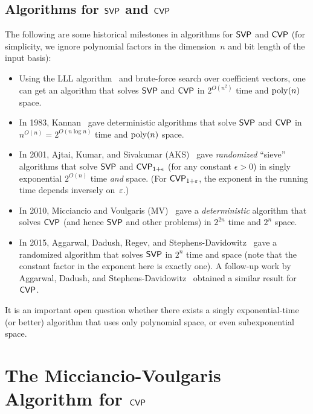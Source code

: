 \documentclass[11pt]{article}
\begin{document}
\subsection{Algorithms for $\mathsf{SVP}$ and $\mathsf{CVP}$}%
\label{sec:algorithms-svp-cvp}

The following are some historical milestones in algorithms for $\mathsf{SVP}$ and $\mathsf{CVP}$ (for simplicity, we ignore polynomial factors in the dimension~$n$ and bit length of the input basis):
\begin{itemize}[itemsep=0pt]
\item Using the LLL algorithm~\cite{lenstra82:_factor} and brute-force
  search over coefficient vectors, one can get an algorithm that
  solves $\mathsf{SVP}$ and $\mathsf{CVP}$ in $2^{O(n^{2})}$ time and $\operatorname{poly}(n)$
  space.
\item In 1983, Kannan~\cite{DBLP:conf/stoc/Kannan83} gave
  deterministic algorithms that solve $\mathsf{SVP}$ and $\mathsf{CVP}$ in
  $n^{O(n)} = 2^{O(n \log n)}$ time and $\operatorname{poly}(n)$ space.
\item In 2001, Ajtai, Kumar, and Sivakumar (AKS)~\cite{DBLP:conf/stoc/AjtaiKS01} gave \emph{randomized} ``sieve'' algorithms that solve $\mathsf{SVP}$ and $\mathsf{CVP}_{1+\epsilon}$ (for any constant $\epsilon > 0$) in singly exponential $2^{O(n)}$ time \emph{and} space.
  (For $\mathsf{CVP}_{1+\varepsilon}$, the exponent in the running time depends inversely on~$\varepsilon$.)
\item In 2010, Micciancio and Voulgaris (MV)~\cite{DBLP:conf/stoc/MicciancioV10} gave a \emph{deterministic} algorithm that solves $\mathsf{CVP}$ (and hence $\mathsf{SVP}$ and other problems) in $2^{2n}$ time and $2^{n}$ space.
\item In 2015, Aggarwal, Dadush, Regev, and Stephens-Davidowitz~\cite{DBLP:conf/stoc/AggarwalDRS15} gave a randomized algorithm that solves $\mathsf{SVP}$ in $2^{n}$ time and space (note that the constant factor in the exponent here is exactly one).
  A follow-up work by Aggarwal, Dadush, and Stephens-Davidowitz~\cite{DBLP:conf/focs/AggarwalDS15} obtained a similar result for $\mathsf{CVP}$.
\end{itemize}
It is an important open question whether there exists a singly exponential-time (or better) algorithm that uses only polynomial space, or even subexponential space.

\section{The Micciancio-Voulgaris Algorithm for $\mathsf{CVP}$}%
\label{sec:mv-alg}
\end{document}
